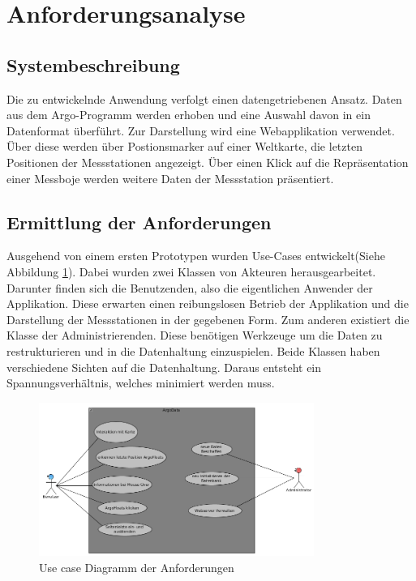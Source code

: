 \section{Anforderungsanalyse}

\subsection{Systembeschreibung}

    Die zu entwickelnde Anwendung verfolgt einen datengetriebenen Ansatz. Daten aus dem Argo-Programm werden erhoben und eine Auswahl davon in ein Datenformat überführt. Zur Darstellung wird eine Webapplikation verwendet. Über diese werden   über Postionsmarker auf einer Weltkarte, die letzten Positionen der Messstationen angezeigt.  Über einen Klick auf die Repräsentation einer Messboje werden weitere Daten der Messstation präsentiert.
    
    

    \subsection{Ermittlung der Anforderungen}
    
    Ausgehend von einem ersten Prototypen wurden Use-Cases entwickelt(Siehe Abbildung \ref{fig:use_case}). Dabei wurden zwei Klassen von Akteuren herausgearbeitet. Darunter finden sich die Benutzenden, also die eigentlichen Anwender der Applikation. Diese erwarten einen reibungslosen Betrieb der Applikation und die Darstellung der Messstationen in der gegebenen Form. Zum anderen existiert die Klasse der Administrierenden. Diese benötigen Werkzeuge um die Daten zu restrukturieren und in die Datenhaltung einzuspielen. Beide Klassen haben verschiedene Sichten auf die Datenhaltung. Daraus entsteht ein Spannungsverhältnis, welches minimiert werden muss.
    
    \begin{figure}[h!]
        \centering
        \includegraphics[width=0.8\textwidth]{pix/use-case.png}
        \caption{Use case Diagramm der Anforderungen}
        \label{fig:use_case}
    \end{figure}
    

